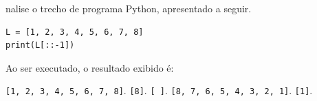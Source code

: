 
{%
\item \rtask \ponto{\pt} 
nalise o trecho de programa Python, apresentado a seguir.

\begin{lstlisting}[style=Python]
L = [1, 2, 3, 4, 5, 6, 7, 8]
print(L[::-1])
\end{lstlisting}

Ao ser executado, o resultado exibido é:

\begin{answerlist}[label={\texttt{\Alph*}.},leftmargin=*]
    \ti \lstinline[style=Python]|[1, 2, 3, 4, 5, 6, 7, 8]|.
    \ti \lstinline[style=Python]|[8]|.
    \ti \lstinline[style=Python]|[ ]|.
    \di \lstinline[style=Python]|[8, 7, 6, 5, 4, 3, 2, 1]|.
    \ti\lstinline[style=Python]|[1]|.
\end{answerlist}



% 
% 
% 
% 
% 
% 
}

